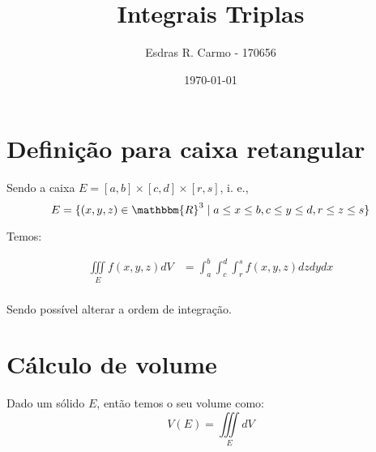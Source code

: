 \documentclass{article}
\author{Esdras R. Carmo - 170656}
\title{Integrais Triplas}
\date{\today}
\newcommand{\REAL}{\mathbbm{R}}
\newcommand{\tripleint}[1] {\iiint\limits_E #1 dV}
\begin{document}
    \maketitle

    \section{Definição para caixa retangular}
        Sendo a caixa $E = [a, b] \times [c, d] \times [r, s]$, i. e.,
        \[
            E = \{(x,y,z) \in \REAL^3 \mid a \leq x \leq b, c \leq y \leq d, r \leq z \leq s \}
        \]

        Temos:

        \begin{align*}
            \tripleint{f(x,y,z)} &= \int_a^b \int_c^d \int_r^s f(x,y,z) dz dy dx\\
        \end{align*}

        Sendo possível alterar a ordem de integração.

    \section{Cálculo de volume}
        Dado um sólido $E$, então temos o seu volume como:
        \[ V(E) = \tripleint{} \]
\end{document}
